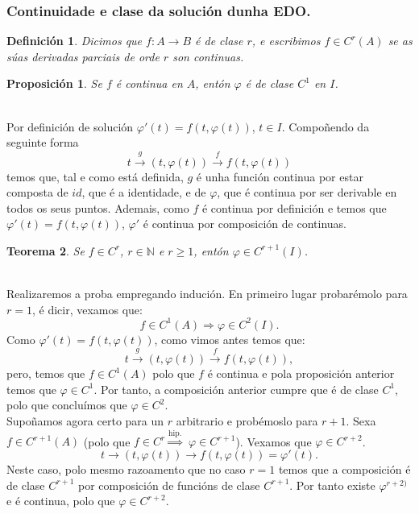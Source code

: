\documentclass[11pt, a4paper,twoside]{article}
\makeatletter
\theoremstyle{theorem-style}  %
\newtheorem{theorem}{Teorema}[section]  %
\newtheorem{proposition}[theorem]{Proposición}
\renewenvironment{proof}[1][\proofname]{\par
	\pushQED{\qed}%
	\normalfont \topsep6\p@\@plus6\p@\relax
	\list{}{%
		\settowidth{\leftmargin}{\quad:\hskip\labelsep}%
		\setlength{\labelwidth}{0pt}%
		\setlength{\itemindent}{-\leftmargin}%
	}%
	\item[\hskip\labelsep\itshape#1\@addpunct{:}]\ignorespaces
}{%
	\popQED\endlist\@endpefalse
}
\theoremstyle{definition-style}
\newtheorem{definition}{Definición}[section]
\theoremstyle{example-style}
\makeatother
\begin{document}
\subsubsection{Continuidade e clase da solución dunha EDO.}
\begin{definition}
	Dicimos que $ f:A\longrightarrow B $ é de clase $ r $, e escribimos $ f\in C^r(A) $ se as súas derivadas parciais de orde $ r $ son continuas.
\end{definition}
\begin{proposition}
	Se $f$ é continua en $A$, entón $\varphi$ é de clase $C^1$ en $I$.
\end{proposition}
\begin{proof} \ \\
	Por definición de solución $\varphi' (t) = f(t, \varphi (t))$, $t \in I$. Compoñendo da seguinte forma
	\[t \stackrel{g}{\longrightarrow} (t, \varphi (t)) \stackrel{f}{\longrightarrow} f(t, \varphi (t))\]
	temos que, tal e como está definida, $g$ é unha función continua por estar composta de $id$, que é a identidade, e de $\varphi$, que é continua por ser derivable en todos os seus puntos. Ademais, como $f$ é continua por definición e temos que $\varphi' (t) = f(t, \varphi (t))$, $\varphi'$ é continua por composición de continuas.
\end{proof}
\begin{theorem}
	Se $f \in C^r$, $r \in \mathbb{N}$ e $r \geq 1$, entón $\varphi \in C^{r+1}(I)$.
\end{theorem}
\begin{proof}\ \\
	Realizaremos a proba empregando indución. En primeiro lugar probarémolo para $r=1$, é dicir, vexamos que:
	\[f\in C^1(A) \Rightarrow \varphi \in C^2(I).\]
	Como $\varphi' (t) = f(t, \varphi (t))$, como vimos antes temos que:
		\[t \stackrel{g}{\longrightarrow} (t, \varphi (t)) \stackrel{f}{\longrightarrow} f(t, \varphi (t)),\]
	pero, temos que $f \in C^1(A)$ polo que $f$ é continua e pola proposición anterior temos que $\varphi \in C^1$. Por tanto, a composición anterior cumpre que é de clase $C^1$, polo que concluímos que $\varphi \in C^2$. \\
	Supoñamos agora certo para un $r$ arbitrario e probémoslo para $r+1$. Sexa $f \in C^{r+1} (A)$ (polo que $f \in C^r \stackrel{\text{hip.}}{\Rightarrow}$ $\varphi \in C^{r+1}$). Vexamos que $\varphi \in C^{r+2}$.
	\[t \longrightarrow (t, \varphi (t)) \longrightarrow f(t, \varphi (t)) = \varphi' (t).\]
	Neste caso, polo mesmo razoamento que no caso $r=1$ temos que a composición é de clase $C^{r+1}$ por composición de funcións de clase $C^{r+1}$. Por tanto existe $\varphi^{r+2)}$ e é continua, polo que $\varphi \in C^{r+2}$. 
\end{proof}
\end{document}
